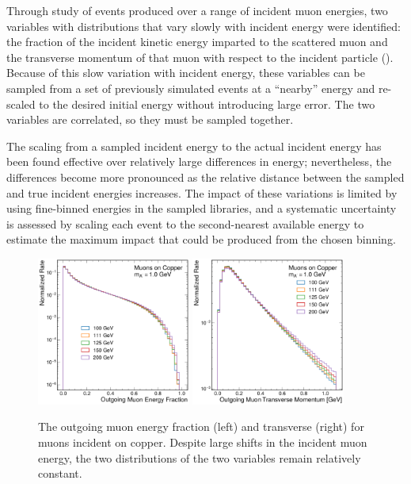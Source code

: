 Through study of \mg events produced over a range of incident muon energies, two variables with distributions that vary slowly with incident energy were identified: the fraction of the incident kinetic energy imparted to the scattered muon and the transverse momentum of that muon with respect to the incident particle (). 
Because of this slow variation with incident energy, these variables can be sampled from a set of previously simulated \mg events at a ``nearby'' energy and re-scaled to the desired initial energy without introducing large error. 
The two variables are correlated, so they must be sampled together. 

The scaling from a sampled \mg incident energy to the actual \gf incident energy has been found effective over relatively large differences in energy; nevertheless, the differences become more pronounced as the relative distance between the sampled and true incident energies increases.
The impact of these variations is limited by using fine-binned energies in the sampled \mg libraries, and a systematic uncertainty is assessed by scaling each event to the second-nearest available energy to estimate the maximum impact that could be produced from the chosen binning. 

\begin{figure}[!htbp]
    \centering
    \includegraphics[width=0.45\textwidth]{figures/muon_energy_comp_efrac.pdf}
    \hspace{0.01\textwidth}
    \includegraphics[width=0.45\textwidth]{figures/muon_energy_comp_pt.pdf}
    \caption[
        Sampling variables used for \dbrem simulation.
    ]{
        The outgoing muon energy fraction (left) and transverse (right) for muons incident on copper. Despite large shifts in the incident muon energy, the two distributions of the two variables remain relatively constant. 
    }
    \label{fig:efrac_pt}
\end{figure}

